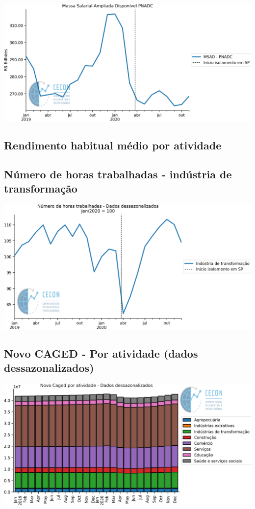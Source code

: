 \documentclass{SelfArx}
\begin{document}
\begin{center}
\includegraphics[width=.9\linewidth]{./figs/Emprego/MSAD.png}
\end{center}

\subsection*{Rendimento habitual médio por atividade}
\label{sec:orga69ea6b}

\subsection*{Número de horas trabalhadas - indústria de transformação}
\label{sec:org35f305e}

\begin{center}
\includegraphics[width=.9\linewidth]{./figs/Emprego/Horas_Transformacao.png}
\end{center}

\subsection*{Novo CAGED  - Por atividade (dados dessazonalizados)}
\label{sec:org4c00f1a}

\begin{center}
\includegraphics[width=.9\linewidth]{./figs/Emprego/NovoCaged_Atividade.png}
\end{center}
\end{document}
